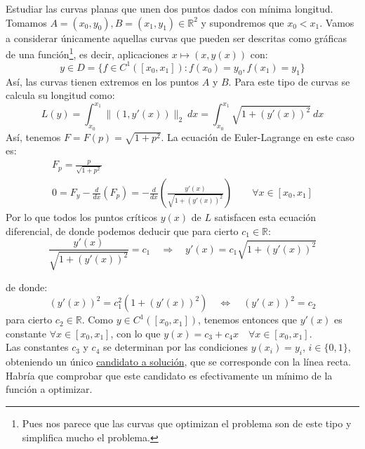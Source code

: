 \begin{ejemplo}
    Estudiar las curvas planas que unen dos puntos dados con mínima longitud.\\

    \noindent
    Tomamos $A = (x_0,y_0), B = (x_1,y_1) \in \mathbb{R}^2$ y supondremos que $x_0<x_1$. Vamos a considerar únicamente aquellas curvas que pueden ser descritas como gráficas de una función\footnote{Pues nos parece que las curvas que optimizan el problema son de este tipo y simplifica mucho el problema.}, es decir, aplicaciones $x\longmapsto (x,y(x))$ con:
    \begin{equation*}
        y \in  D = \{f\in C^1([x_0,x_1]) : f(x_0) = y_0, f(x_1) = y_1\}
    \end{equation*}
    Así, las curvas tienen extremos en los puntos $A$ y $B$. Para este tipo de curvas se calcula su longitud como:
    \begin{equation*}
        L(y) = \int_{x_0}^{x_1} \|(1,y'(x))\|_2~dx = \int_{x_0}^{x_1} \sqrt{1+{(y'(x))}^{2}}~dx 
    \end{equation*}
    Así, tenemos $F= F(p) = \sqrt{1+p^2}$. La ecuación de Euler-Lagrange en este caso es:
    \begin{gather*}
        F_p = \frac{p}{\sqrt{1+p^2}} \\
        0 = F_y - \frac{d}{dx}(F_p) = -\frac{d}{dx} \left(\frac{y'(x)}{\sqrt{1+{(y'(x))}^{2}}}\right) \qquad \forall x\in [x_0,x_1]
    \end{gather*}
    Por lo que todos los puntos críticos $y(x)$ de $L$ satisfacen esta ecuación diferencial, de donde podemos deducir que para cierto $c_1\in \mathbb{R}$:
    \begin{equation*}
        \frac{y'(x)}{\sqrt{1+{(y'(x))}^{2}}} = c_1  \quad\Longrightarrow\quad y'(x) = c_1\sqrt{1+{(y'(x))}^{2}}
    \end{equation*}
    
    de donde:
    \begin{equation*}
        {(y'(x))}^{2} = c_1^2 \left( 1+{(y'(x))}^{2} \right) \quad\Longleftrightarrow\quad {(y'(x))}^{2} = c_2
    \end{equation*}
    para cierto $c_2\in \mathbb{R}$. Como $y\in C^1([x_0,x_1])$, tenemos entonces que $y'(x)$ es constante $\forall x\in [x_0,x_1]$, con lo que $y(x) = c_3 + c_4x\quad \forall x\in [x_0,x_1]$.\\

    \noindent
    Las constantes $c_3$ y $c_4$ se determinan por las condiciones $y(x_i) = y_i$, $i \in \{0,1\}$, obteniendo un único \underline{candidato a solución}, que se corresponde con la línea recta. Habría que comprobar que este candidato es efectivamente un mínimo de la función a optimizar.
\end{ejemplo}

